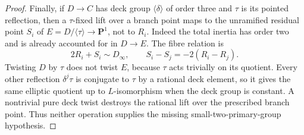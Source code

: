 \begin{proof}
Finally, if \(D\to C\) has deck group \(\langle\delta\rangle\)
of order three and \(\tau\) is its pointed reflection,
then a \(\tau\)-fixed lift over a branch point maps to the
unramified residual point \(S_i\) of
\(E=D/\langle\tau\rangle\to\mathbf P^1\), not to \(R_i\).
Indeed the total inertia has order two and is already
accounted for in \(D\to E\). The fibre relation is
\[
                     2R_i+S_i\sim D_\infty,\qquad
                     S_i-S_j=-2(R_i-R_j).
\]
Twisting \(D\) by \(\tau\) does not twist \(E\), because
\(\tau\) acts trivially on its quotient. Every other reflection
\(\delta^j\tau\) is conjugate to \(\tau\) by a rational deck
element, so it gives the same elliptic quotient up to
\(L\)-isomorphism when the deck group is constant.
A nontrivial pure deck twist destroys the rational lift over
the prescribed branch point. Thus neither operation supplies
the missing small-two-primary-group hypothesis.
\end{proof}


